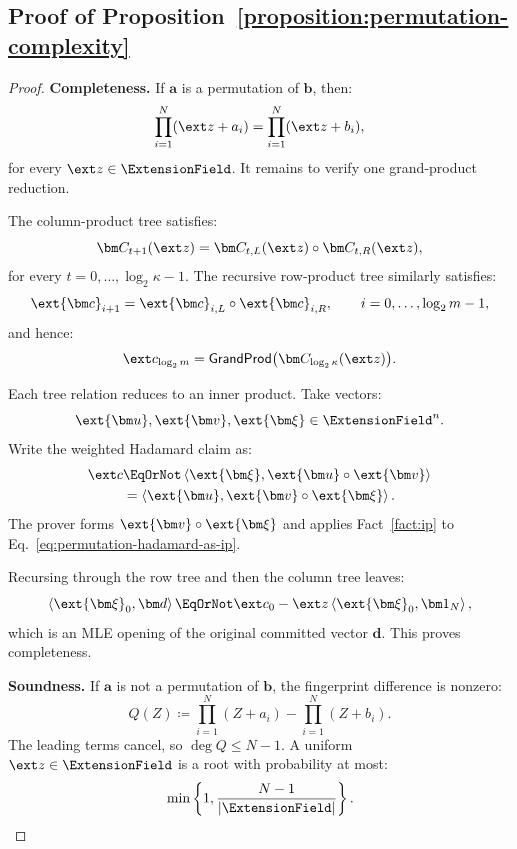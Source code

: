 \subsection{Proof of Proposition~\ref{proposition:permutation-complexity}}
\label{appx:proof-permutation}

\begin{proof}
\noindent\textbf{Completeness.}
If \(\bm a\) is a permutation of \(\bm b\), then:
\[
    \prod_{i=1}^{N}(\ext z+a_i)
    =
    \prod_{i=1}^{N}(\ext z+b_i),
\]
for every \(\ext z\in\ExtensionField\). It remains to verify
one grand-product reduction.

The column-product tree satisfies:
\[
    \bm C_{t+1}(\ext z)
    =
    \bm C_{t,L}(\ext z)
    \circ
    \bm C_{t,R}(\ext z),
\]
for every
\(t=0,\ldots,\log_2\kappa-1\). The recursive row-product tree
similarly satisfies:
\[
    \ext{\bm c}_{i+1}
    =
    \ext{\bm c}_{i,L}
    \circ
    \ext{\bm c}_{i,R},
    \qquad
    i=0,\ldots,\log_2m-1,
\]
and hence:
\[
    \ext c_{\log_2m}
    =
    \mathsf{GrandProd}
    \bigl(
        \bm C_{\log_2\kappa}(\ext z)
    \bigr).
\]

Each tree relation reduces to an inner product. Take vectors:
\[
    \ext{\bm u},
    \ext{\bm v},
    \ext{\bm\xi}
    \in\ExtensionField^n.
\]
Write the weighted Hadamard claim as:
\begin{equation}
\begin{aligned}
    \ext c
    &\EqOrNot
    \left\langle
        \ext{\bm\xi},
        \ext{\bm u}\circ\ext{\bm v}
    \right\rangle\\
    &=
    \left\langle
        \ext{\bm u},
        \ext{\bm v}\circ\ext{\bm\xi}
    \right\rangle.
\end{aligned}
\label{eq:permutation-hadamard-as-ip}
\end{equation}
The prover forms
\(
    \ext{\bm v}\circ\ext{\bm\xi}
\)
and applies Fact~\ref{fact:ip} to
Eq.~\eqref{eq:permutation-hadamard-as-ip}.

Recursing through the row tree and then the column tree leaves:
\[
    \left\langle
        \ext{\bm\xi}_0,\bm d
    \right\rangle
    \EqOrNot
    \ext c_0
    -
    \ext z
    \left\langle
        \ext{\bm\xi}_0,\bm 1_N
    \right\rangle,
\]
which is an MLE opening of the original committed vector
\(\bm d\). This proves completeness.

\smallskip\noindent\textbf{Soundness.}
If \(\bm a\) is not a permutation of \(\bm b\), the fingerprint
difference is nonzero:
\[
    Q(Z)
    \coloneqq
    \prod_{i=1}^{N}(Z+a_i)
    -
    \prod_{i=1}^{N}(Z+b_i).
\]
The leading terms cancel, so \(\deg Q\leq N-1\). A uniform
\(\ext z\in\ExtensionField\) is a root with probability at most:
\[
    \min\left\{
        1,
        \frac{N-1}{|\ExtensionField|}
    \right\}.
\]


\end{proof}
